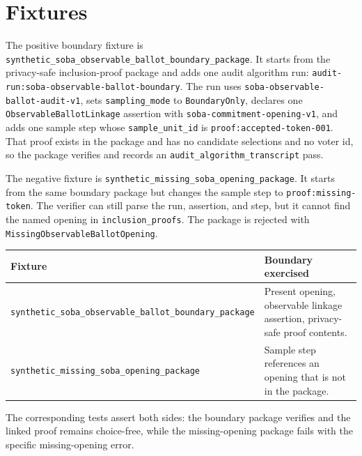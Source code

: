 \section{Fixtures}

The positive boundary fixture is
\texttt{synthetic\_soba\_observable\_ballot\_boundary\_package}. It starts from
the privacy-safe inclusion-proof package and adds one audit algorithm run:
\texttt{audit-run:soba-observable-ballot-boundary}. The run uses
\texttt{soba-observable-ballot-audit-v1}, sets
\texttt{sampling\_mode} to \texttt{BoundaryOnly}, declares one
\texttt{ObservableBallotLinkage} assertion with
\texttt{soba-commitment-opening-v1}, and adds one sample step whose
\texttt{sample\_unit\_id} is \texttt{proof:accepted-token-001}. That proof
exists in the package and has no candidate selections and no voter id, so the
package verifies and records an \texttt{audit\_algorithm\_transcript} pass.

The negative fixture is
\texttt{synthetic\_missing\_soba\_opening\_package}. It starts from the same
boundary package but changes the sample step to
\texttt{proof:missing-token}. The verifier can still parse the run, assertion,
and step, but it cannot find the named opening in \texttt{inclusion\_proofs}.
The package is rejected with \texttt{MissingObservableBallotOpening}.

\begin{center}
\small
\begin{tabularx}{\textwidth}{lX}
\toprule
Fixture & Boundary exercised \\
\midrule
\texttt{synthetic\_soba\_observable\_ballot\_boundary\_package} & Present opening, observable linkage assertion, privacy-safe proof contents. \\
\texttt{synthetic\_missing\_soba\_opening\_package} & Sample step references an opening that is not in the package. \\
\bottomrule
\end{tabularx}
\end{center}

The corresponding tests assert both sides: the boundary package verifies and
the linked proof remains choice-free, while the missing-opening package fails
with the specific missing-opening error.
